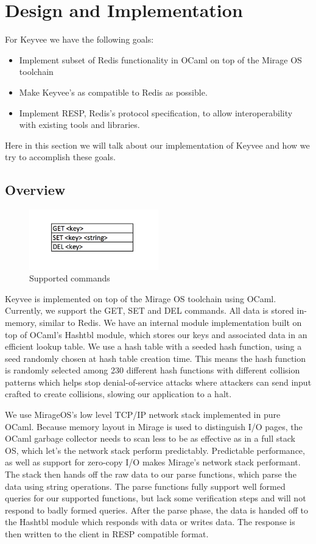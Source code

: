\documentclass[english,10pt,twocolumn]{article}
\begin{document}
\section{Design and Implementation}
For Keyvee we have the following goals:
\begin{itemize}
  \item Implement subset of Redis functionality in OCaml on top of the Mirage OS toolchain
  \item Make Keyvee's as compatible to Redis as possible.
  \item Implement RESP, Redis's protocol specification, to allow interoperability with existing tools and libraries.
\end{itemize}

Here in this section we will talk about our implementation of Keyvee and how we try to accomplish these goals.

\subsection{Overview}

\begin{figure}[ht]
  \centering
  \caption{Supported commands}
  \includegraphics[width=0.5\textwidth]{images/commands}
\end{figure}

Keyvee is implemented on top of the Mirage OS toolchain using OCaml.
Currently, we support the GET, SET and DEL commands.
All data is stored in-memory, similar to Redis.
We have an internal module implementation built on top of OCaml's Hashtbl module, which stores our keys and associated data in an efficient lookup table.
We use a hash table with a seeded hash function, using a seed randomly chosen at hash table creation time.
This means the hash function is randomly selected among 230 different hash functions with different collision patterns which helps stop denial-of-service attacks where attackers can send input crafted to create collisions, slowing our application to a halt.

We use MirageOS's low level TCP/IP network stack implemented in pure OCaml.
Because memory layout in Mirage is used to distinguish I/O pages, the OCaml garbage collector needs to scan less to be as effective as in a full stack OS, which let's the network stack perform predictably.
Predictable performance, as well as support for zero-copy I/O makes Mirage's network stack performant.
The stack then hands off the raw data to our parse functions, which parse the data using string operations.
The parse functions fully support well formed queries for our supported functions, but lack some verification steps and will not respond to badly formed queries.
After the parse phase, the data is handed off to the Hashtbl module which responds with data or writes data.
The response is then written to the client in RESP compatible format.
\end{document}
